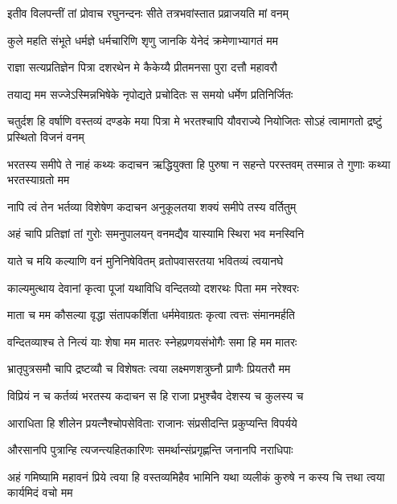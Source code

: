 \twolineshloka
{इतीव विलपन्तीं तां प्रोवाच रघुनन्दनः}
{सीते तत्रभवांस्तात प्रव्राजयति मां वनम्} %

\twolineshloka
{कुले महति संभूते धर्मज्ञे धर्मचारिणि}
{शृणु जानकि येनेदं क्रमेणाभ्यागतं मम} %

\twolineshloka
{राज्ञा सत्यप्रतिज्ञेन पित्रा दशरथेन मे}
{कैकेय्यै प्रीतमनसा पुरा दत्तौ महावरौ} %

\twolineshloka
{तयाद्य मम सज्जेऽस्मिन्नभिषेके नृपोद्यते}
{प्रचोदितः स समयो धर्मेण प्रतिनिर्जितः} %

\threelineshloka
{चतुर्दश हि वर्षाणि वस्तव्यं दण्डके मया}
{पित्रा मे भरतश्चापि यौवराज्ये नियोजितः}
{सोऽहं त्वामागतो द्रष्टुं प्रस्थितो विजनं वनम्} %

\threelineshloka
{भरतस्य समीपे ते नाहं कथ्यः कदाचन}
{ऋद्धियुक्ता हि पुरुषा न सहन्ते परस्तवम्}
{तस्मान्न ते गुणाः कथ्या भरतस्याग्रतो मम} %

\twolineshloka
{नापि त्वं तेन भर्तव्या विशेषेण कदाचन}
{अनुकूलतया शक्यं समीपे तस्य वर्तितुम्} %

\twolineshloka
{अहं चापि प्रतिज्ञां तां गुरोः समनुपालयन्}
{वनमद्यैव यास्यामि स्थिरा भव मनस्विनि} %

\twolineshloka
{याते च मयि कल्याणि वनं मुनिनिषेवितम्}
{व्रतोपवासरतया भवितव्यं त्वयानघे} %

\twolineshloka
{काल्यमुत्थाय देवानां कृत्वा पूजां यथाविधि}
{वन्दितव्यो दशरथः पिता मम नरेश्वरः} %

\twolineshloka
{माता च मम कौसल्या वृद्धा संतापकर्शिता}
{धर्ममेवाग्रतः कृत्वा त्वत्तः संमानमर्हति} %

\twolineshloka
{वन्दितव्याश्च ते नित्यं याः शेषा मम मातरः}
{स्नेहप्रणयसंभोगैः समा हि मम मातरः} %

\twolineshloka
{भ्रातृपुत्रसमौ चापि द्रष्टव्यौ च विशेषतः}
{त्वया लक्ष्मणशत्रुघ्नौ प्राणैः प्रियतरौ मम} %

\twolineshloka
{विप्रियं न च कर्तव्यं भरतस्य कदाचन}
{स हि राजा प्रभुश्चैव देशस्य च कुलस्य च} %

\twolineshloka
{आराधिता हि शीलेन प्रयत्नैश्चोपसेविताः}
{राजानः संप्रसीदन्ति प्रकुप्यन्ति विपर्यये} %

\twolineshloka
{औरसानपि पुत्रान्हि त्यजन्त्यहितकारिणः}
{समर्थान्संप्रगृह्णन्ति जनानपि नराधिपाः} %

\fourlineindentedshloka
{अहं गमिष्यामि महावनं प्रिये}
{ त्वया हि वस्तव्यमिहैव भामिनि}
{यथा व्यलीकं कुरुषे न कस्य चि}
{त्तथा त्वया कार्यमिदं वचो मम} %


